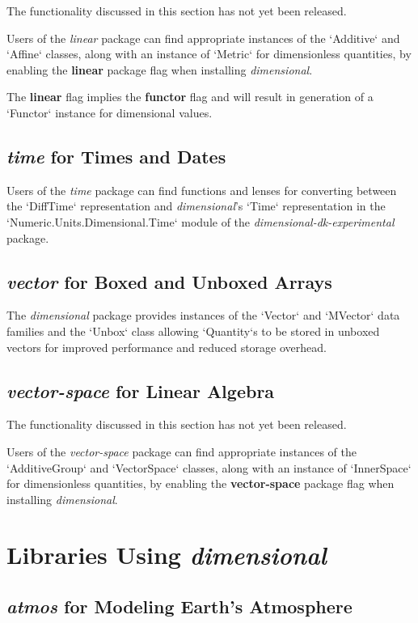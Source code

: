 \documentclass[11pt]{report}
\newcommand{\packagename}[1]{\textit{#1}}
\newcommand{\thispackage}{\packagename{dimensional}}
\newcommand{\experimentalpackage}{\packagename{dimensional-dk-experimental}}
\newcommand{\submodule}[1]{`Numeric.Units.Dimensional.{#1}`}
\newcommand{\flag}[1]{\textbf{#1}}
\newcommand{\prerelease}{\begin{framed}
The functionality discussed in this section has not yet been released.
\end{framed}}
\begin{document}
\prerelease{}

Users of the \packagename{linear} package can find appropriate instances of
the `Additive` and `Affine` classes, along with an
instance of `Metric` for dimensionless quantities, by enabling the \flag{linear}
package flag when installing \thispackage{}.

The \flag{linear} flag implies the \flag{functor} flag and will result in generation of a `Functor`
instance for dimensional values.

\section{\packagename{time} for Times and Dates}

Users of the \packagename{time} package can find functions and lenses for converting
between the `DiffTime` representation and \thispackage{}'s `Time` representation in the
\submodule{Time} module of the \experimentalpackage{} package.

\section{\packagename{vector} for Boxed and Unboxed Arrays}

The \thispackage{} package provides instances of the `Vector` and `MVector` data families and the `Unbox` class
allowing `Quantity`s to be stored in unboxed vectors for improved performance and reduced storage overhead.

\section{\packagename{vector-space} for Linear Algebra}

\prerelease{}

Users of the \packagename{vector-space} package can find appropriate instances of
the `AdditiveGroup` and `VectorSpace` classes, along with an
instance of `InnerSpace` for dimensionless quantities, by enabling the \flag{vector-space}
package flag when installing \thispackage{}.

\chapter{Libraries Using \thispackage}

\section{\packagename{atmos} for Modeling Earth's Atmosphere}
\end{document}
